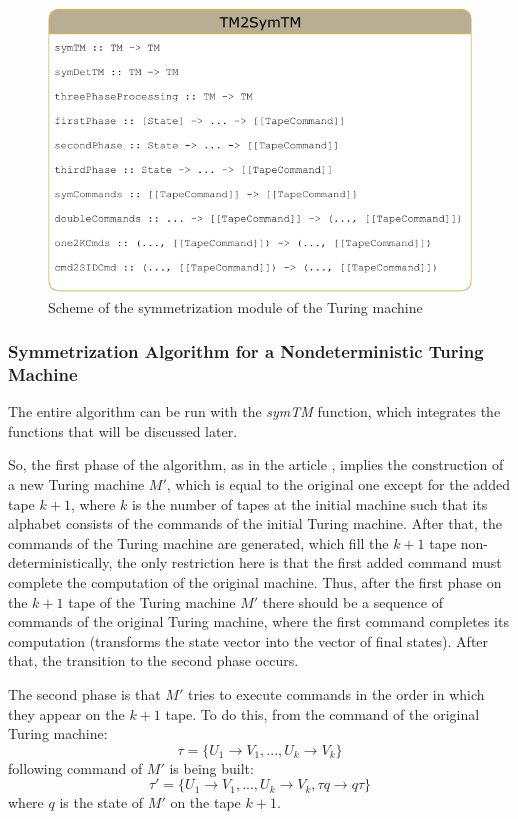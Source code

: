 \documentclass[conference]{IEEEtran}
\theoremstyle{definition}
\begin{document}
\begin{figure}[H]
\centering
  \includegraphics[width=\linewidth]{pics/TM2SymTM(1).pdf}
  \caption{Scheme of the symmetrization module of the Turing machine}
  \label{fig:TM2SymTM}
\end{figure}

\subsubsection{Symmetrization Algorithm for a Nondeterministic Turing Machine}

The entire algorithm can be run with the \textit{symTM} function, which integrates the functions that will be discussed later.

So, the first phase of the algorithm, as in the article \cite{Sapir}, implies the construction of a new Turing machine $ M'$, which is equal to the original one except for the added tape $ k + 1 $, where $ k $ is the number of tapes at the initial machine such that its alphabet consists of the commands of the initial Turing machine. After that, the commands of the Turing machine are generated, which fill the $ k + 1 $ tape non-deterministically, the only restriction here is that the first added command must complete the computation of the original machine. Thus, after the first phase on the $ k + 1 $ tape of the Turing machine $ M '$ there should be a sequence of commands of the original Turing machine, where the first command completes its computation (transforms the state vector into the vector of final states). After that, the transition to the second phase occurs.

The second phase is that $ M'$ tries to execute commands in the order in which they appear on the $ k + 1 $ tape. To do this, from the command of the original Turing machine:
$$\tau = \{ U_1 \to V_1, ... , U_k \to V_k \}$$
following command of $ M'$ is being built:
$$\tau' = \{ U_1 \to V_1, ... , U_k \to V_k, \tau q \to q \tau \}$$
where $ q $ is the state of $ M'$ on the tape $ k + 1 $.
\end{document}
